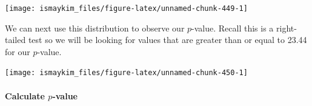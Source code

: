 \documentclass[12pt, krantz2,]{krantz}
\makeatletter
\newenvironment{Shaded}{\begin{snugshade}}{\end{snugshade}}
\newcommand{\DataTypeTok}[1]{\textcolor[rgb]{0.27,0.27,0.27}{#1}}
\newcommand{\DecValTok}[1]{\textcolor[rgb]{0.06,0.06,0.06}{#1}}
\newcommand{\KeywordTok}[1]{\textcolor[rgb]{0.27,0.27,0.27}{\textbf{#1}}}
\newcommand{\NormalTok}[1]{#1}
\newcommand{\OperatorTok}[1]{\textcolor[rgb]{0.43,0.43,0.43}{\textbf{#1}}}
\newcommand{\StringTok}[1]{\textcolor[rgb]{0.5,0.5,0.5}{#1}}
\let\oldparagraph\paragraph
\renewcommand{\paragraph}[1]{\oldparagraph{#1}\mbox{}}
\newenvironment{kframe}{%
\medskip{}
\setlength{\fboxsep}{.8em}
 \def\at@end@of@kframe{}%
 \ifinner\ifhmode%
  \def\at@end@of@kframe{\end{minipage}}%
  \begin{minipage}{\columnwidth}%
 \fi\fi%
 \def\FrameCommand##1{\hskip\@totalleftmargin \hskip-\fboxsep
 \colorbox{shadecolor}{##1}\hskip-\fboxsep
     \hskip-\linewidth \hskip-\@totalleftmargin \hskip\columnwidth}%
 \MakeFramed {\advance\hsize-\width
   \@totalleftmargin\z@ \linewidth\hsize
   \@setminipage}}%
 {\par\unskip\endMakeFramed%
 \at@end@of@kframe}
\renewenvironment{Shaded}{\begin{kframe}}{\end{kframe}}
\makeatother
\begin{document}
\begin{Shaded}
\end{Shaded}

\begin{Shaded}
\end{Shaded}

\begin{center}\texttt{[image: ismaykim\_files/figure-latex/unnamed-chunk-449-1]} \end{center}

We can next use this distribution to observe our \(p\)-value. Recall this is a right-tailed test so we will be looking for values that are greater than or equal to 23.44 for our \(p\)-value.

\begin{Shaded}
\end{Shaded}

\begin{center}\texttt{[image: ismaykim\_files/figure-latex/unnamed-chunk-450-1]} \end{center}

\hypertarget{calculate-p-value}{%
\paragraph{\texorpdfstring{Calculate \(p\)-value}{Calculate p-value}}\label{calculate-p-value}}
\end{document}
